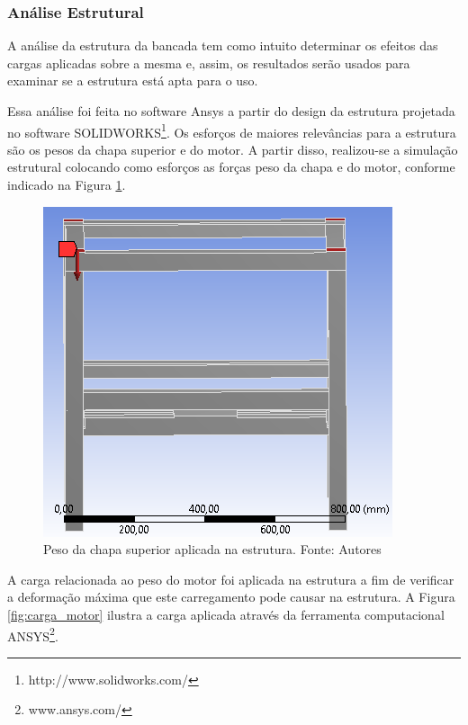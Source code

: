\subsubsection*{\textbf{Análise Estrutural}}

    A análise da estrutura da bancada tem como intuito determinar os efeitos das cargas aplicadas sobre a mesma e, assim, os resultados serão usados para examinar se a estrutura está apta para o uso.

    Essa análise foi feita no software Ansys a partir do design da estrutura projetada no software SOLIDWORKS\footnote{http://www.solidworks.com/}. Os esforços de maiores relevâncias para a estrutura são os pesos da chapa superior e do motor. A partir disso, realizou-se a simulação estrutural colocando como esforços as forças peso da chapa e do motor, conforme indicado na Figura \ref{fig:an_estrutural}.

  \begin{figure}[H]
      \centering
      \includegraphics[scale=0.7]{figuras/an_estrutural.png}
      \caption{Peso da chapa superior aplicada na estrutura. Fonte: Autores}
      \label{fig:an_estrutural}
      \end{figure}

    A carga relacionada ao peso do motor foi aplicada na estrutura a fim de verificar a deformação máxima que este carregamento pode causar na estrutura. 
    A  Figura \ref{fig:carga_motor} ilustra a carga aplicada através da ferramenta computacional ANSYS\footnote{www.ansys.com/}.


